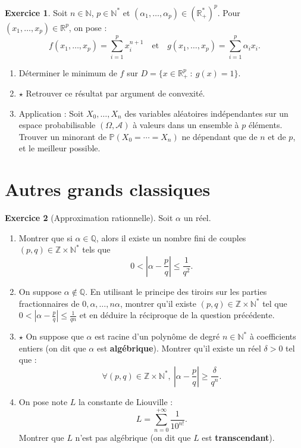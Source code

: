 \documentclass[french]{article}
\renewcommand{\P}{\mathbb{P}}
\newcommand{\N}{\mathbb{N}}
\newcommand{\Z}{\mathbb{Z}}
\newcommand{\Q}{\mathbb{Q}}
\newcommand{\R}{\mathbb{R}}
\newcommand{\st}{^*}
\theoremstyle{definition}
\newtheorem{exo}{Exercice}
\begin{document}
\begin{exo}
	Soit $n\in\N$, $p\in\N\st$ et $(\alpha_1,\ldots,\alpha_p)\in(\R_+\st)^p$. Pour $(x_1,\ldots,x_p)\in\R^p$, on pose :
	$$f(x_1,\ldots,x_p)=\sum_{i=1}^{p}x_i^{n+1}\quad\text{et}\quad g(x_1,\ldots,x_p)=\sum_{i=1}^{p}\alpha_ix_i.$$
	\begin{enumerate}
		\item Déterminer le minimum de $f$ sur $D=\{x\in \R_+^p\ :\ g(x)=1\}$.
		\item $\star$ Retrouver ce résultat par argument de convexité.
		\item Application : Soit $X_0,\ldots,X_n$ des variables aléatoires indépendantes sur un espace probabilisable $(\Omega,\mathcal{A})$ à valeurs dans un ensemble à $p$ éléments.\\
		Trouver un minorant de $\P(X_0=\cdots=X_n)$ ne dépendant que de $n$ et de $p$, et le meilleur possible.
	\end{enumerate}
\end{exo}

\section*{Autres grands classiques}

\begin{exo}[Approximation rationnelle]
	Soit $\alpha$ un réel.
	\begin{enumerate}
		\item Montrer que si $\alpha\in\Q$, alors il existe un nombre fini de couples $(p,q)\in\Z\times\N\st$ tels que $$0<\left\lvert\alpha-\frac{p}{q}\right\rvert\leqslant\frac{1}{q^2}.$$
		\item On suppose $\alpha\notin\Q$. En utilisant le principe des tiroirs sur les parties fractionnaires de $0,\alpha,\ldots,n\alpha$, montrer qu'il existe $(p,q)\in\Z\times\N\st$ tel que $0<\displaystyle\left\lvert\alpha-\frac{p}{q}\right\rvert\leqslant\frac{1}{qn}$ et en déduire la réciproque de la question précédente.
		\item $\star$ On suppose que $\alpha$ est racine d'un polynôme de degré $n\in\N\st$ à coefficients entiers (on dit que $\alpha$ est \textbf{algébrique}). Montrer qu'il existe un réel $\delta>0$ tel que :
		$$\forall (p,q)\in\Z\times\N\st,\ \left\lvert\alpha-\frac{p}{q}\right\rvert\geqslant\frac{\delta}{q^n}.$$
		\item On pose note $L$ la constante de Liouville :
		$$L=\sum_{n=0}^{+\infty}\frac{1}{10^{n!}}.$$
		Montrer que $L$ n'est pas algébrique (on dit que $L$ est \textbf{transcendant}).
	\end{enumerate}
\end{exo}
\end{document}
